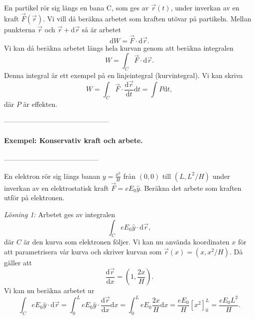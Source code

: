 \documentclass[%
oneside,                 %
final,                   %
10pt]{article}
\begin{document}
En partikel rör sig längs en bana C, som ges av $\vec{r}(t)$, under inverkan av en kraft $\vec{F}(\vec{r})$.  Vi vill då beräkna arbetet som kraften utövar på partikeln.  Mellan punkterna $\vec{r}$ och $\vec{r}+\mbox{d}\vec{r}$ så är arbetet
\begin{equation}
  \mbox{d}W = \vec{F}\cdot \mbox{d}\vec{r}.
\end{equation}
Vi kan då beräkna arbetet längs hela kurvan genom att beräkna integralen
\begin{equation}
  W = \int_C \vec{F}\cdot \mbox{d}\vec{r}.
\end{equation}
Denna integral är ett exempel på en linjeintegral (kurvintegral). Vi kan skriva
\begin{equation}
  W = \int_C \vec{F} \cdot \frac{\mbox{d}\vec{r}}{\mbox{d}t} \mbox{d}t = \int P \mbox{d}t,
\end{equation}
där $P$ är effekten.

---------------------------------------------

\paragraph{Exempel: Konservativ kraft och arbete.}
-----------------------------------------

En elektron rör sig längs banan $y = \frac{x^2}{H}$ från $(0,0)$ till $(L,L^2/H)$ under inverkan av en elektrostatisk kraft $\vec{F} = e E_0\hat{y}$.  Beräkna det arbete som kraften utför på elektronen.

\emph{Lösning 1:}  Arbetet ges av integralen
\begin{equation}
  \int_C eE_0 \hat{y} \cdot \mbox{d}\vec{r},
\end{equation}
där $C$ är den kurva som elektronen följer.  Vi kan nu använda koordinaten $x$ för att parametrisera vår kurva och skriver kurvan som $\vec{r}(x) = (x, x^2/H)$.  Då gäller att
\begin{equation}
  \frac{\mbox{d}\vec{r}}{\mbox{d}x} = \left(1,\frac{2x}{H}\right).
\end{equation}
Vi kan nu beräkna arbetet ur
\begin{equation}
  \int_C eE_0 \hat{y} \cdot \mbox{d}\vec{r} = \int_0^LeE_0 \hat{y} \cdot
\frac{\mbox{d}\vec{r}}{\mbox{d}x} \mbox{d}x = \int_0^LeE_0 \frac{2x}{H} 
\mbox{d}x = \frac{eE_0}{H} \left[x^2\right]_0^L = \frac{e E_0 L^2}{H}.
\end{equation}
\end{document}
